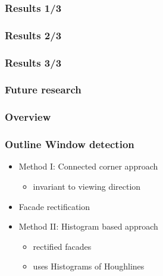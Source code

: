 \documentclass{beamer}
\begin{document}
\frame
{
	\frametitle{Results 1/3}
}


\frame
{
	\frametitle{Results 2/3}
}


\frame
{
	\frametitle{Results 3/3}
}

\frame
{
	\frametitle{Future research}

}

\frame
{
	\frametitle{Overview}
}




\frame
{
	\frametitle{Outline Window detection}
	\begin{itemize}
	\item  <+-| alert@+> Method I: Connected corner approach 
		\begin{itemize}
		\item  <+-| alert@+> invariant to viewing direction
		\end{itemize}
	\item  <+-| alert@+> Facade rectification 
	\item  <+-| alert@+> Method II: Histogram based approach
		\begin{itemize}
		\item  <+-| alert@+> rectified facades 
		\item  <+-| alert@+> uses Histograms of Houghlines
		\end{itemize}
	\end{itemize}
}
\end{document}
